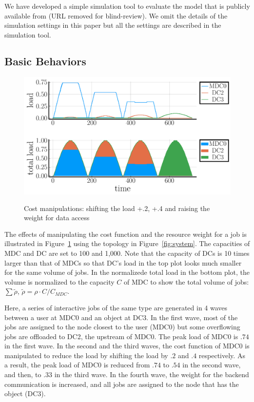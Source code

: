
We have developed a simple simulation tool to evaluate the model
that is publicly available from (URL removed for blind-review).
We omit the details of the simulation settings in this paper but all
the settings are described in the simulation tool.

\subsection{Basic Behaviors}

\begin{figure}[tb]
  \begin{center}
    \includegraphics[width=1.0\columnwidth]{fig6-4nodes.pdf}
    \vspace{-2.0ex}
    \caption{Cost manipulations: shifting the load +.2,
      +.4 and raising the weight for data access}
    \smallskip
    \raggedright
    \small
    \label{fig:lowering}
  \end{center}
\end{figure}

The effects of manipulating the cost function and the resource weight
for a job is illustrated in Figure~\ref{fig:lowering} using the
topology in Figure~\ref{fig:system}.
The capacities of MDC and DC are set to 100 and 1,000.
Note that the capacity of DCs is 10 times larger than that of MDCs
so that DC's load in the top plot looks much smaller for the same
volume of jobs.
In the normalizede total load in the bottom plot, the volume is normalized
to the capacity $C$ of MDC to show the total volume of jobs:
$\sum \tilde{\rho}$, \:$\tilde{\rho} = \rho \cdot C/C_{MDC}$.

Here, a series of interactive jobs of the same type are generated in
4 waves between a user at MDC0 and an object at DC3.
In the first wave,  most of the jobs are assigned to the node closest
to the user (MDC0) but some overflowing jobs are offloaded to DC2, the
upstream of MDC0.
The peak load of MDC0 is $.74$ in the first wave.
In the second and the third waves, the cost function of MDC0 is
manipulated to reduce the load by shifting the load by $.2$ and $.4$
respectively. As a result, the peak load of MDC0 is
reduced from $.74$ to $.54$ in the second wave, and then, to $.33$ in the
third wave.
In the fourth wave, the weight for the backend communication is
increased, and all jobs are assigned to the node that has the object
(DC3).

